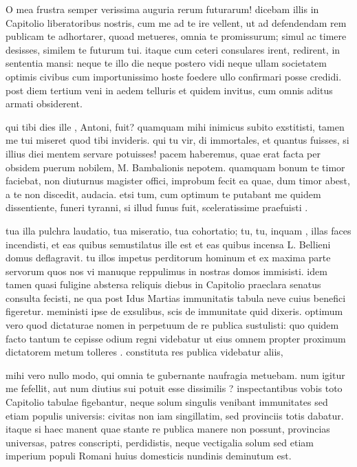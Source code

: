  O mea frustra semper verissima auguria rerum futurarum! dicebam illis in Capitolio liberatoribus nostris, cum me ad te ire vellent, ut ad defendendam rem publicam te adhortarer, quoad metueres, omnia te promissurum; simul ac timere desisses, similem te futurum tui. itaque cum ceteri consulares irent, redirent, in sententia mansi: neque te illo die neque postero vidi neque ullam societatem optimis civibus cum importunissimo hoste foedere ullo confirmari posse credidi. post diem tertium veni in aedem telluris et quidem invitus, cum omnis aditus armati obsiderent.

 qui tibi dies ille , Antoni, fuit? quamquam mihi inimicus subito exstitisti, tamen me tui miseret quod tibi invideris. qui tu vir, di immortales, et quantus fuisses, si illius diei mentem servare potuisses! pacem haberemus, quae erat facta per obsidem puerum nobilem, M. Bambalionis nepotem. quamquam bonum te timor faciebat, non diuturnus magister offici, improbum fecit ea quae, dum timor abest, a te non discedit, audacia. etsi tum, cum optimum te putabant me quidem dissentiente, funeri tyranni, si illud funus fuit, sceleratissime praefuisti .

 tua illa pulchra laudatio, tua miseratio, tua cohortatio; tu, tu, inquam , illas faces incendisti, et eas quibus semustilatus ille est et eas quibus incensa L. Bellieni domus deflagravit. tu illos impetus perditorum hominum et ex maxima parte servorum quos nos vi manuque reppulimus in nostras domos immisisti. idem tamen quasi fuligine abstersa reliquis diebus in Capitolio praeclara senatus consulta fecisti, ne qua post Idus Martias immunitatis tabula neve cuius benefici figeretur. meministi ipse de exsulibus, scis de immunitate quid dixeris. optimum vero quod dictaturae nomen in perpetuum de re publica sustulisti: quo quidem facto tantum te cepisse odium regni videbatur ut eius omnem propter proximum dictatorem metum tolleres . constituta res publica videbatur aliis,

 mihi vero nullo modo, qui omnia te gubernante naufragia metuebam. num igitur me fefellit, aut num diutius sui potuit esse dissimilis ? inspectantibus vobis toto Capitolio tabulae figebantur, neque solum singulis venibant immunitates sed etiam populis universis: civitas non iam singillatim, sed provinciis totis dabatur. itaque si haec manent quae stante re publica manere non possunt, provincias universas, patres conscripti, perdidistis, neque vectigalia solum sed etiam imperium populi Romani huius domesticis nundinis deminutum est.

